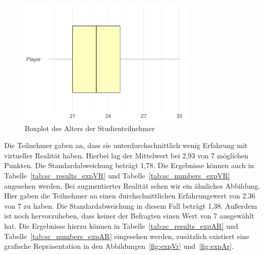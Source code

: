 \begin{figure}
	\includegraphics[width=0.75\textwidth]{./appendices/age}
	\caption{Boxplot des Alters der Studienteilnehmer}
	\label{fig:age}
\end{figure}

Die Teilnehmer gaben an, dass sie unterdurchschnittlich wenig Erfahrung mit virtueller Realität haben. Hierbei lag der Mittelwert bei 2,93 von 7 möglichen Punkten. Die Standardabweichung beträgt 1,78. Die Ergebnisse können auch in Tabelle~\ref{tab:sc_results_expVR} und Tabelle~\ref{tab:sc_numbers_expVR} angesehen werden. Bei augmentierter Realität sehen wir ein ähnliches Abbildung. Hier gaben die Teilnehmer an einen durchschnittlichen Erfahrungswert von 2.36 von 7 zu haben. Die Standardabweichung in diesem Fall beträgt 1,38. Außerdem ist noch hervorzuheben, dass keiner der Befragten einen Wert von 7 ausgewählt hat. Die Ergebnisse hierzu können in Tabelle~\ref{tab:sc_results_expAR} und Tabelle~\ref{tab:sc_numbers_expAR} eingesehen werden, zusätzlich existiert eine grafische Repräsentation in den Abbildungen~\ref{fig:expVr} und~\ref{fig:expAr}.

